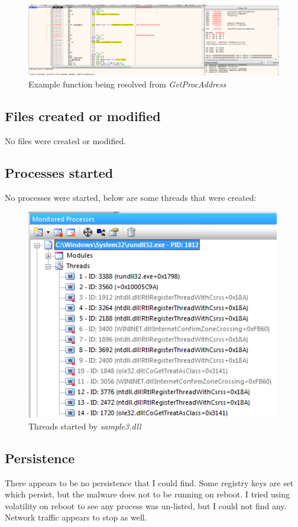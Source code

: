 \documentclass{article}
\begin{document}
    \begin{figure}[H]
        \includegraphics[width=\textwidth]{resolveprocaddress.png}
        \caption{Example function being resolved from \textit{GetProcAddress}}
    \end{figure}
    \subsection{Files created or modified}
    No files were created or modified.
    \subsection{Processes started}
    No processes were started, below are some threads that were created:
    \begin{figure}[H]
        \includegraphics[width=\textwidth]{threads.png}
        \caption{Threads started by \textit{sample3.dll}}
    \end{figure}
    \subsection{Persistence}
    There appears to be no persistence that I could find. Some registry keys are set which persist, but the malware does not to be running on reboot. I tried using volatility on reboot to see any process was un-listed, but I could not find any. Network traffic appears to stop as well.
\end{document}
